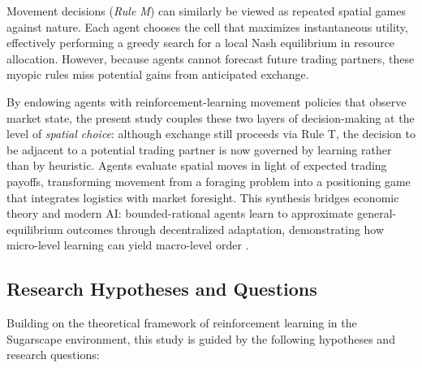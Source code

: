 \documentclass[pdflatex,sn-mathphys-num]{sn-jnl}%
\theoremstyle{thmstyleone}%
\theoremstyle{thmstyletwo}%
\theoremstyle{thmstylethree}%
\begin{document}
Movement decisions (\textit{Rule M}) can similarly be viewed as repeated spatial games against nature.  
Each agent chooses the cell that maximizes instantaneous utility, effectively performing a greedy search for a local Nash equilibrium in resource allocation.  
However, because agents cannot forecast future trading partners, these myopic rules miss potential gains from anticipated exchange.
    
By endowing agents with reinforcement-learning movement policies that observe market state, the present study couples these two layers of decision-making at the level of \emph{spatial choice}: although exchange still proceeds via Rule T, the decision to be adjacent to a potential trading partner is now governed by learning rather than by heuristic.  
Agents evaluate spatial moves in light of expected trading payoffs, transforming movement from a foraging problem into a positioning game that integrates logistics with market foresight.  
This synthesis bridges economic theory and modern AI: bounded-rational agents learn to approximate general-equilibrium outcomes through decentralized adaptation, demonstrating how micro-level learning can yield macro-level order \citep{Leibo2017, Hughes2018, Zheng2022}.


\subsection{Research Hypotheses and Questions}
Building on the theoretical framework of reinforcement learning in the Sugarscape environment, this study is guided by the following hypotheses and research questions:
\end{document}
